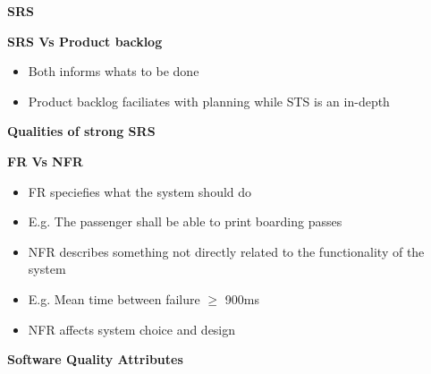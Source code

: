 \documentclass[10pt, landscape]{article}
\begin{document}
\begin{multicols}{4}
\textbf{SRS}


\textbf{SRS Vs Product backlog}
\begin{itemize}
  \item Both informs whats to be done 
  \item Product backlog faciliates with planning while STS is an in-depth
\end{itemize}


\textbf{Qualities of strong SRS}

\textbf{FR Vs NFR}
\begin{itemize}
  \item FR speciefies what the system should do
  \item E.g. The passenger shall be able to print boarding passes 
  \item NFR describes something not directly related to the functionality of the system
  \item E.g. Mean time between failure $\ge$ 900ms
  \item NFR affects system choice and design
\end{itemize}

\textbf{Software Quality Attributes}

\end{multicols}
\end{document}
